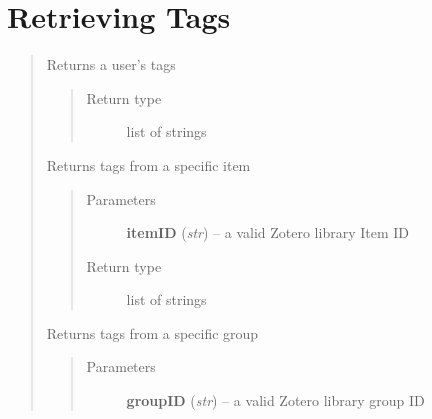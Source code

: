 \documentclass[letterpaper,10pt,english]{sphinxmanual}
\begin{document}
\section{Retrieving Tags}
\label{index:retrieving-tags}\begin{quote}


\begin{fulllineitems}
\label{index:pyzotero.zotero.Zotero.tags}
Returns a user's tags
\begin{quote}\begin{description}
\item[{Return type}] \leavevmode
list of strings

\end{description}\end{quote}

\end{fulllineitems}



\begin{fulllineitems}
\label{index:pyzotero.zotero.Zotero.item_tags}
Returns tags from a specific item
\begin{quote}\begin{description}
\item[{Parameters}] \leavevmode
\textbf{itemID} (\emph{str}) -- a valid Zotero library Item ID

\item[{Return type}] \leavevmode
list of strings

\end{description}\end{quote}

\end{fulllineitems}



\begin{fulllineitems}
\label{index:pyzotero.zotero.Zotero.group_tags}
Returns tags from a specific group
\begin{quote}\begin{description}
\item[{Parameters}] \leavevmode
\textbf{groupID} (\emph{str}) -- a valid Zotero library group ID


\end{description}
\end{quote}
\end{fulllineitems}
\end{quote}
\end{document}
